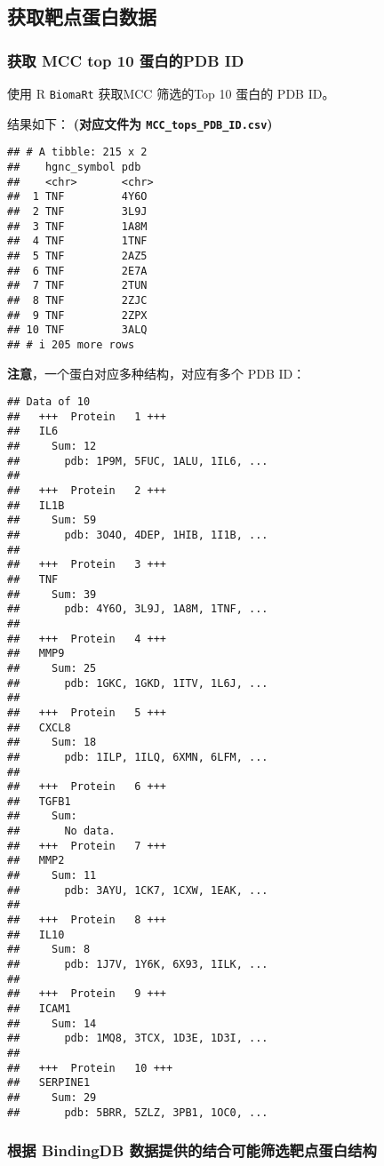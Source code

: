\documentclass[
]{article}
\begin{document}
\hypertarget{ux83b7ux53d6ux9776ux70b9ux86cbux767dux6570ux636e}{%
\subsection{获取靶点蛋白数据}\label{ux83b7ux53d6ux9776ux70b9ux86cbux767dux6570ux636e}}

\hypertarget{pdbID}{%
\subsubsection{获取 MCC top 10 蛋白的PDB ID}\label{pdbID}}

使用 R \texttt{BiomaRt} 获取MCC 筛选的Top 10 蛋白的 PDB ID。

结果如下：
\textbf{(对应文件为 \texttt{MCC\_tops\_PDB\_ID.csv})}

\begin{verbatim}
## # A tibble: 215 x 2
##    hgnc_symbol pdb  
##    <chr>       <chr>
##  1 TNF         4Y6O 
##  2 TNF         3L9J 
##  3 TNF         1A8M 
##  4 TNF         1TNF 
##  5 TNF         2AZ5 
##  6 TNF         2E7A 
##  7 TNF         2TUN 
##  8 TNF         2ZJC 
##  9 TNF         2ZPX 
## 10 TNF         3ALQ 
## # i 205 more rows
\end{verbatim}

\textbf{注意}，一个蛋白对应多种结构，对应有多个 PDB ID：

\begin{verbatim}
## Data of 10 
##   +++  Protein   1 +++
##   IL6
##     Sum: 12
##       pdb: 1P9M, 5FUC, 1ALU, 1IL6, ...
## 
##   +++  Protein   2 +++
##   IL1B
##     Sum: 59
##       pdb: 3O4O, 4DEP, 1HIB, 1I1B, ...
## 
##   +++  Protein   3 +++
##   TNF
##     Sum: 39
##       pdb: 4Y6O, 3L9J, 1A8M, 1TNF, ...
## 
##   +++  Protein   4 +++
##   MMP9
##     Sum: 25
##       pdb: 1GKC, 1GKD, 1ITV, 1L6J, ...
## 
##   +++  Protein   5 +++
##   CXCL8
##     Sum: 18
##       pdb: 1ILP, 1ILQ, 6XMN, 6LFM, ...
## 
##   +++  Protein   6 +++
##   TGFB1
##     Sum: 
##       No data.
##   +++  Protein   7 +++
##   MMP2
##     Sum: 11
##       pdb: 3AYU, 1CK7, 1CXW, 1EAK, ...
## 
##   +++  Protein   8 +++
##   IL10
##     Sum: 8
##       pdb: 1J7V, 1Y6K, 6X93, 1ILK, ...
## 
##   +++  Protein   9 +++
##   ICAM1
##     Sum: 14
##       pdb: 1MQ8, 3TCX, 1D3E, 1D3I, ...
## 
##   +++  Protein   10 +++
##   SERPINE1
##     Sum: 29
##       pdb: 5BRR, 5ZLZ, 3PB1, 1OC0, ...
\end{verbatim}

\hypertarget{ux6839ux636e-bindingdb-ux6570ux636eux63d0ux4f9bux7684ux7ed3ux5408ux53efux80fdux7b5bux9009ux9776ux70b9ux86cbux767dux7ed3ux6784}{%
\subsubsection{根据 BindingDB 数据提供的结合可能筛选靶点蛋白结构}\label{ux6839ux636e-bindingdb-ux6570ux636eux63d0ux4f9bux7684ux7ed3ux5408ux53efux80fdux7b5bux9009ux9776ux70b9ux86cbux767dux7ed3ux6784}}
\end{document}
